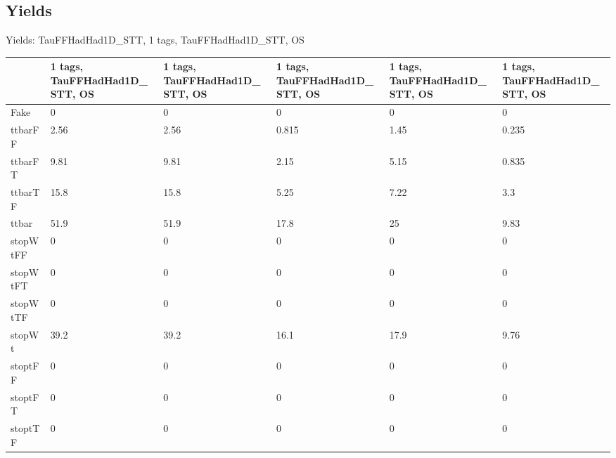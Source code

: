 
\subsection{Yields}

\begin{frame}{Yields: TauFFHadHad1D\_STT, 1 tags, TauFFHadHad1D\_STT, OS}
\begin{center}
  \begin{tabular}{l| >{\centering\let\newline\\\arraybackslash\hspace{0pt}}m{1.4cm}| >{\centering\let\newline\\\arraybackslash\hspace{0pt}}m{1.4cm}| >{\centering\let\newline\\\arraybackslash\hspace{0pt}}m{1.4cm}| >{\centering\let\newline\\\arraybackslash\hspace{0pt}}m{1.4cm}| >{\centering\let\newline\\\arraybackslash\hspace{0pt}}m{1.4cm}}
    & 1 tags, TauFFHadHad1D\_STT, OS & 1 tags, TauFFHadHad1D\_STT, OS & 1 tags, TauFFHadHad1D\_STT, OS & 1 tags, TauFFHadHad1D\_STT, OS & 1 tags, TauFFHadHad1D\_STT, OS \\
 \hline \hline
    Fake& 0 & 0 & 0 & 0 & 0 \\
 \hline
    ttbarFF& 2.56 & 2.56 & 0.815 & 1.45 & 0.235 \\
 \hline
    ttbarFT& 9.81 & 9.81 & 2.15 & 5.15 & 0.835 \\
 \hline
    ttbarTF& 15.8 & 15.8 & 5.25 & 7.22 & 3.3 \\
 \hline
    ttbar& 51.9 & 51.9 & 17.8 & 25 & 9.83 \\
 \hline
    stopWtFF& 0 & 0 & 0 & 0 & 0 \\
 \hline
    stopWtFT& 0 & 0 & 0 & 0 & 0 \\
 \hline
    stopWtTF& 0 & 0 & 0 & 0 & 0 \\
 \hline
    stopWt& 39.2 & 39.2 & 16.1 & 17.9 & 9.76 \\
 \hline
    stoptFF& 0 & 0 & 0 & 0 & 0 \\
 \hline
    stoptFT& 0 & 0 & 0 & 0 & 0 \\
 \hline
    stoptTF& 0 & 0 & 0 & 0 & 0 \\

\end{tabular}
\end{center}
\end{frame}
